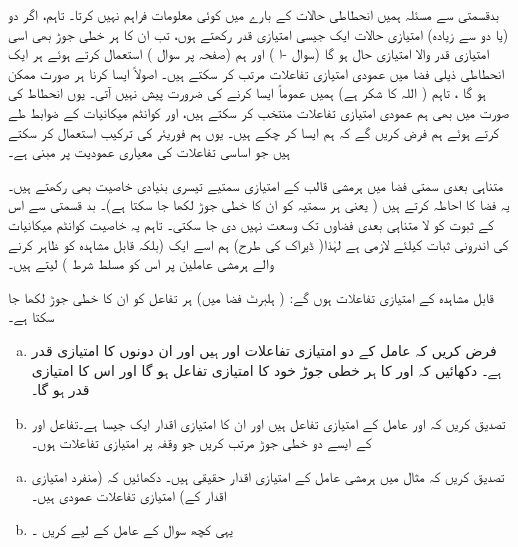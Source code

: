  بدقسمتی سے مسئلہ  ہمیں انحطاطی حالات  کے بارے میں کوئی معلومات فراہم نہیں کرتا۔ تاہم، اگر دو (یا دو سے زیادہ) امتیازی حالات ایک  جیسی امتیازی قدر رکھتے ہوں، تب ان کا ہر خطی جوڑ بھی اسی امتیازی قدر والا امتیازی حال ہو گا (سوال -ا ) اور ہم   (صفحہ  پر سوال  ) استعمال کرتے ہوئے ہر ایک انحطاطی ذیلی فضا میں عمودی امتیازی تفاعلات   مرتب   کر سکتے ہیں۔ اصولاً  ایسا کرنا ہر صورت ممکن ہو گا ، تاہم ( اللہ کا شکر ہے) ہمیں عموماً ایسا کرنے کی ضرورت پیش نہیں آتی۔ یوں انحطاط کی صورت میں بھی ہم عمودی امتیازی تفاعلات منتخب کر سکتے ہیں، اور کوانٹم میکانیات کے ضوابط طے کرتے ہوئے ہم فرض کریں گے کہ ہم ایسا کر چکے ہیں۔ یوں ہم فوریئر کی ترکیب استعمال کر سکتے ہیں جو اساسی تفاعلات کی معیاری عمودیت پر مبنی ہے۔


 متناہی بعدی سمتی فضا میں ہرمشی قالب کے امتیازی سمتیے  تیسری بنیادی خاصیت بھی رکھتے ہیں۔ یہ فضا کا  احاطہ کرتے ہیں ( یعنی ہر سمتیہ کو ان کا خطی جوڑ لکھا جا سکتا ہے)۔ بد قسمتی سے اس کے ثبوت کو لا متناہی بعدی فضاوں تک وسعت نہیں دی جا سکتی۔ تاہم یہ خاصیت کوانٹم میکانیات کی اندرونی ثبات  کیلئے لازمی ہے لہٰذا( ڈیراک کی طرح) ہم اسے ایک  (بلکہ قابل مشاہدہ کو ظاہر کرنے والے ہرمشی عاملین پر اس کو مسلط شرط ) لیتے ہیں۔
 
 قابل مشاہدہ کے امتیازی تفاعلات  ہوں گے: ( ہلبرٹ فضا میں) ہر تفاعل کو ان کا خطی جوڑ لکھا جا سکتا ہے۔ 

\begin{enumerate}[a.]
\item
 فرض کریں کہ عامل  کے دو امتیازی تفاعلات  اور  ہیں اور ان دونوں کا امتیازی قدر  ہے۔ دکھائیں کہ  اور  کا ہر خطی جوڑ خود  کا امتیازی تفاعل ہو گا اور اس کا امتیازی قدر  ہو گا۔
\item
 تصدیق کریں کہ  اور  عامل  کے امتیازی تفاعل ہیں اور ان کا امتیازی اقدار ایک  جیسا ہے۔تفاعل  اور  کے ایسے دو خطی جوڑ مرتب کریں  جو وقفہ  پر  امتیازی تفاعلات ہوں۔
\end{enumerate}
\begin{enumerate}[a.]
\item
 تصدیق کریں کہ مثال  میں ہرمشی عامل کے امتیازی اقدار حقیقی ہیں۔ دکھائیں کہ (منفرد امتیازی اقدار کے) امتیازی تفاعلات عمودی ہیں۔ 
\item
 یہی کچھ سوال  کے عامل کے لیے کریں ۔
\end{enumerate}


